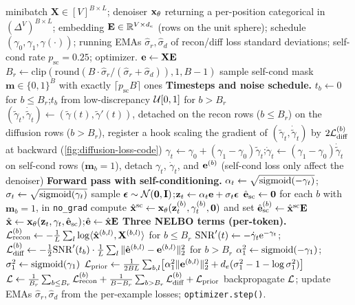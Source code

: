 \documentclass{article}
\begin{document}
\begin{algorithm}[H]
\caption{One Plaid training step.}
\label{alg:training-algo}
\begin{algorithmic}[1]
\Require minibatch $\mathbf{X}\in [V]^{B\times L}$; denoiser ${\mathbf x}_\theta$ returning a per-position categorical in $(\Delta^V)^{B\times L}$; embedding ${\mathbf E}\in\mathbb{R}^{V\times d_e}$ (rows on the unit sphere); schedule $(\gamma_0, \gamma_1, \gamma(\cdot))$; running EMAs $\hat\sigma_r, \hat\sigma_d$ of recon/diff loss standard deviations; self-cond rate $p_\text{sc} = 0.25$; optimizer.
\State ${\mathbf e} \gets \mathbf{X}{\mathbf E}$
\State $B_r \gets \mathrm{clip}(\mathrm{round}(B \cdot \hat\sigma_r / (\hat\sigma_r + \hat\sigma_d)), 1, B-1)$ 
\State sample self-cond mask $\mathbf{m}\in\{0,1\}^B$ with exactly $\lceil p_\text{sc} B\rceil$ ones
\Statex
\State \textbf{Timesteps and noise schedule.}
\State $t_b \gets 0$ for $b \le B_r$;\quad $t_b$ from low-discrepancy $\mathcal{U}[0,1]$ for $b > B_r$
\State $(\tilde\gamma_t, \dot{\tilde\gamma}_t) \gets (\tilde{\gamma}(t), \tilde{\gamma}'(t))$, detached on the recon rows ($b \le B_r$)
\State on the diffusion rows ($b > B_r$), register a hook scaling the gradient of $(\tilde\gamma_t, \dot{\tilde\gamma}_t)$ by $2 \mathcal{L}_\text{diff}^{(b)}$ at backward (\cref{fig:diffusion-loss-code})
\State $\gamma_t \gets \gamma_0 + (\gamma_1 - \gamma_0) \tilde\gamma_t$;\quad $\dot\gamma_t \gets (\gamma_1 - \gamma_0) \dot{\tilde\gamma}_t$
\State on self-cond rows ($\mathbf{m}_b = 1$), detach $\gamma_t$, $\dot\gamma_t$, and ${\mathbf e}^{(b)}$ (self-cond loss only affect the denoiser)
\Statex
\State \textbf{Forward pass with self-conditioning.}
\State $\alpha_t \gets \sqrt{\operatorname{sigmoid}(-\gamma_t)}$;\quad $\sigma_t \gets \sqrt{\operatorname{sigmoid}(\gamma_t)}$
\State sample ${\boldsymbol{\epsilon}} \sim \mathcal{N}({\mathbf 0}, {\mathbf I})$;\quad ${\mathbf z}_t \gets \alpha_t {\mathbf e} + \sigma_t {\boldsymbol{\epsilon}}$
\State $\hat{{\mathbf e}}_\text{sc} \gets \mathbf{0}$
    \State for each $b$ with $\mathbf{m}_b = 1$, in \texttt{no\_grad} compute $\hat{{\mathbf x}}^\text{sc} \gets {\mathbf x}_\theta({\mathbf z}_t^{(b)}, \gamma_t^{(b)}, \mathbf{0})$ and set $\hat{{\mathbf e}}_\text{sc}^{(b)} \gets \hat{{\mathbf x}}^\text{sc} {\mathbf E}$
\EndIf
\State $\hat{{\mathbf x}} \gets {\mathbf x}_\theta({\mathbf z}_t, \gamma_t, \hat{{\mathbf e}}_\text{sc})$;\quad $\hat{{\mathbf e}} \gets \hat{{\mathbf x}} {\mathbf E}$
\Statex
\State \textbf{Three NELBO terms (per-token).}
\State $\mathcal{L}_\text{recon}^{(b)} \gets -\frac{1}{L} \sum_l \log \langle \hat{{\mathbf x}}^{(b,l)}, \mathbf{X}^{(b,l)} \rangle$ for $b \le B_r$
\State ${\mathrm{SNR}}'(t) \gets -\dot\gamma_t {\mathrm{e}}^{-\gamma_t}$;\quad $\mathcal{L}_\text{diff}^{(b)} \gets -\frac{1}{2} {\mathrm{SNR}}'(t_b) \cdot \frac{1}{L} \sum_l \|\hat{{\mathbf e}}^{(b,l)} - {\mathbf e}^{(b,l)}\|^2_2$ for $b > B_r$
\State $\alpha_1^2 \gets \operatorname{sigmoid}(-\gamma_1)$;\quad $\sigma_1^2 \gets \operatorname{sigmoid}(\gamma_1)$
\State $\mathcal{L}_\text{prior} \gets \frac{1}{2BL} \sum_{b,l} \bigl[\alpha_1^2 \|{\mathbf e}^{(b,l)}\|^2_2 + d_e (\sigma_1^2 - 1 - \log \sigma_1^2)\bigr]$
\Statex
\State $\mathcal{L} \gets \frac{1}{B_r} \sum_{b \le B_r} \mathcal{L}_\text{recon}^{(b)} + \frac{1}{B - B_r} \sum_{b > B_r} \mathcal{L}_\text{diff}^{(b)} + \mathcal{L}_\text{prior}$
\State backpropagate $\mathcal{L}$; update EMAs $\hat\sigma_r, \hat\sigma_d$ from the per-example losses; \texttt{optimizer.step()}.
\end{algorithmic}
\end{algorithm}
\end{document}
